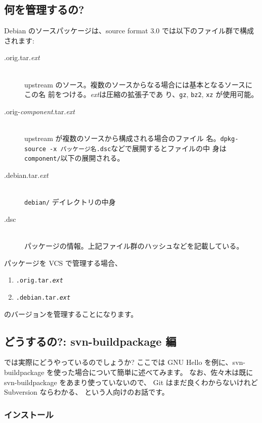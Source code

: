 \documentclass[mingoth,a4paper]{jsarticle}
\begin{document}
\subsection{何を管理するの?}
Debian のソースパッケージは、source format 3.0 では以下のファイル群で構成されます:
\begin{description}
\item[.orig.tar.{\it{ext}}]　\\
  upstream のソース。複数のソースからなる場合には基本となるソースにこの名
  前をつける。{\it{ext}}は圧縮の拡張子であ
  り、{\tt{gz}}, {\tt{bz2}}, {\tt{xz}} が使用可能。
\item[.orig-{\it{component}}.tar.{\it{ext}}] 　\\
  upstream が複数のソースから構成される場合のファイル
  名。{\tt{dpkg-source -x パッケージ名.dsc}}などで展開するとファイルの中
  身は {\tt{component/}}以下の展開される。
\item[.debian.tar.{\it{ext}}]　\\
  {\tt{debian/}} デイレクトリの中身
\item[.dsc]　\\
  パッケージの情報。上記ファイル群のハッシュなどを記載している。
\end{description}
パッケージを VCS で管理する場合、
\begin{enumerate}
\item {\tt{.orig.tar.{\it{ext}}}}
\item {\tt{.debian.tar.{\it{ext}}}}
\end{enumerate}
のバージョンを管理することになります。

\subsection{どうするの?: svn-buildpackage 編}

では実際にどうやっているのでしょうか?
ここでは GNU Hello を例に、svn-buildpackage を使った場合について簡単に述べてみます。
なお、佐々木は既に svn-buildpackage をあまり使っていないので、
Git はまだ良くわからないけれど Subversion ならわかる、 という人向けのお話です。

\subsubsection{インストール}
\end{document}

